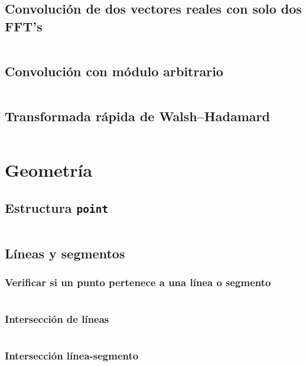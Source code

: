\documentclass[11pt]{article}
\begin{document}
		\subsection{Convolución de dos vectores reales con solo dos FFT's}
		\inputminted[tabsize=2,breaklines,firstline=336,lastline=356,fontsize=\small]{c++}{fft.cpp}
			
		\subsection{Convolución con módulo arbitrario}
		\inputminted[tabsize=2,breaklines,firstline=358,lastline=415,fontsize=\small]{c++}{fft.cpp}
		
		\subsection{Transformada rápida de Walsh–Hadamard}
		\inputminted[tabsize=2,breaklines,firstline=417,lastline=448,fontsize=\small]{c++}{fft.cpp}
			
	\newpage
	\section{Geometría}
		\subsection{Estructura \texttt{point}}
		\inputminted[tabsize=2,breaklines,firstline=3,lastline=60,fontsize=\small]{c++}{geometry.cpp}
		
		\subsection{Líneas y segmentos}
			\subsubsection{Verificar si un punto pertenece a una línea o segmento}
			\inputminted[tabsize=2,breaklines,firstline=62,lastline=70,fontsize=\small]{c++}{geometry.cpp}
			
			\subsubsection{Intersección de líneas}
			\inputminted[tabsize=2,breaklines,firstline=72,lastline=91,fontsize=\small]{c++}{geometry.cpp}
			
			\subsubsection{Intersección línea-segmento}
			\inputminted[tabsize=2,breaklines,firstline=93,lastline=106,fontsize=\small]{c++}{geometry.cpp}
			
\end{document}
